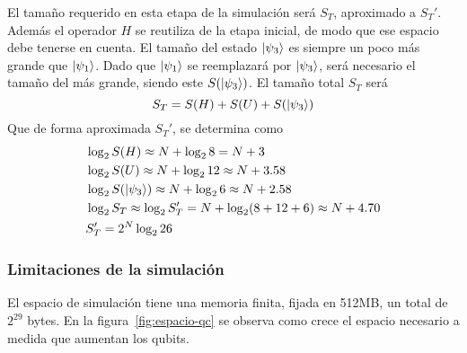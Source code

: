 El tamaño requerido en esta etapa de la simulación será $S_T$, aproximado a 
$S_T'$. Además el operador $H$ se reutiliza de la etapa inicial, de modo que ese 
espacio debe tenerse en cuenta. El tamaño del estado $\ket{\psi_{3}}$ es siempre un 
poco más grande que $\ket{\psi_{1}}$. Dado que $\ket{\psi_{1}}$ se reemplazará por $\ket{\psi_{3}}$, 
será necesario el tamaño del más grande, siendo este $S(\ket{\psi_{3}})$. El tamaño 
total $S_T$ será
$$ S_T = S(H) + S(U) + S(\ket{\psi_{3}})$$
Que de forma aproximada $S_T'$, se determina como
%
\begin{equation*}
\begin{split}
&\log_2 S(H) \approx N + \log_2 8 = N+3 \\
&\log_2 S(U) \approx N + \log_2 12 \approx N+3.58\\
&\log_2 S(\ket{\psi_{3}}) \approx N + \log_2 6 \approx N+2.58 \\
&\log_2 S_T \approx \log_2 S_T' = N+\log_2 (8 + 12 + 6) \approx N+4.70 \\
&S_T' = 2^N \log_226
\end{split}
\end{equation*}

\subsubsection{Limitaciones de la simulación}

El espacio de simulación tiene una memoria finita, fijada en 512MB, un total de 
$2^{29}$ bytes. En la figura~\ref{fig:espacio-qc} se observa como crece el 
espacio necesario a medida que aumentan los qubits.

